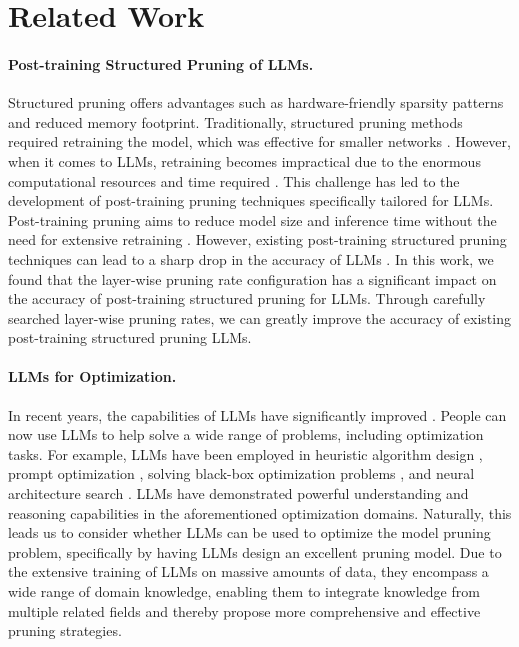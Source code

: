 \section{Related Work}
\label{RelatedWork}
\paragraph{Post-training Structured Pruning of LLMs.}
Structured pruning \citep{ma2023llm} offers advantages such as hardware-friendly sparsity patterns and reduced memory footprint. Traditionally, structured pruning methods required retraining the model, which was effective for smaller networks \citep{molchanov2016pruning, hou2020dynabert}. However, when it comes to LLMs, retraining becomes impractical due to the enormous computational resources and time required \citep{xia2023sheared, minitron2024}. This challenge has led to the development of post-training pruning techniques specifically tailored for LLMs. Post-training pruning aims to reduce model size and inference time without the need for extensive retraining \citep{ma2023llm, sun2023simple}. However, existing post-training structured pruning techniques can lead to a sharp drop in the accuracy of LLMs \citep{ma2023llm, an2024fluctuation}. In this work, we found that the layer-wise pruning rate configuration has a significant impact on the accuracy of post-training structured pruning for LLMs. Through carefully searched layer-wise pruning rates, we can greatly improve the accuracy of existing post-training structured pruning LLMs.

\paragraph{LLMs for Optimization.}
In recent years, the capabilities of LLMs have significantly improved \citep{naveed2023comprehensive}. People can now use LLMs to help solve a wide range of problems, including optimization tasks. For example, LLMs have been employed in heuristic algorithm design \citep{liu2024evolution, romera2024mathematical}, prompt optimization \citep{yang2024large}, solving black-box optimization problems \citep{liu2024large, song2024position}, and neural architecture search \citep{zheng2023can, chen2024evoprompting}. LLMs have demonstrated powerful understanding and reasoning capabilities \citep{brown2020language, wei2022chain} in the aforementioned optimization domains. Naturally, this leads us to consider whether LLMs can be used to optimize the model pruning problem, specifically by having LLMs design an excellent pruning model. Due to the extensive training of LLMs on massive amounts of data, they encompass a wide range of domain knowledge, enabling them to integrate knowledge from multiple related fields \citep{madani2023large, hong2023metagpt} and thereby propose more comprehensive and effective pruning strategies.

